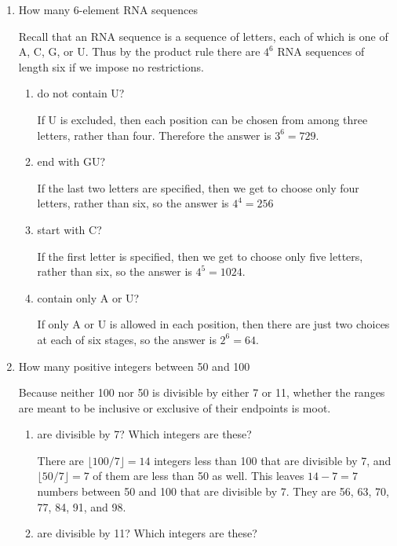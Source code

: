 \documentclass[11pt]{article}
\begin{document}
\begin{enumerate}[label=\textbf{\arabic*.}]
	\item How many 6-element RNA sequences
	
	Recall that an RNA sequence is a sequence of letters, each of which is one of A, C, G, or U. Thus by the product rule there are $4^6$ RNA sequences of length six if we impose no restrictions.
	
	\begin{enumerate}[label=\textbf{\alph*)}]
		\item do not contain U?
		
		If U is excluded, then each position can be chosen from among three letters, rather than four. Therefore the answer is $3^6 = 729$.
		
		\item end with GU?
		
		If the last two letters are specified, then we get to choose only four letters, rather than six, so the answer is $4^4 = 256$
		
		\item start with C?
		
		If the first letter is specified, then we get to choose only five letters, rather than six, so the answer is $4^5 = 1024$.
		
		\item contain only A or U?
		
		If only A or U is allowed in each position, then there are just two choices at each of six stages, so the answer is $2^6 = 64$.
	\end{enumerate}

	\item How many positive integers between 50 and 100
	
	Because neither 100 nor 50 is divisible by either 7 or 11, whether the ranges are meant to be inclusive or exclusive of their endpoints is moot.
	
	\begin{enumerate}[label=\textbf{\alph*)}]
		\item are divisible by 7? Which integers are these?
		
		There are $\lfloor 100 / 7 \rfloor = 14$ integers less than 100 that are divisible by 7, and $\lfloor 50 / 7 \rfloor = 7$ of them are less than 50 as well. This leaves $14 - 7 = 7$ numbers between 50 and 100 that are divisible by 7. They are 56, 63, 70, 77, 84, 91, and 98.
		
		\item are divisible by 11? Which integers are these?
		

\end{enumerate}
\end{enumerate}
\end{document}
